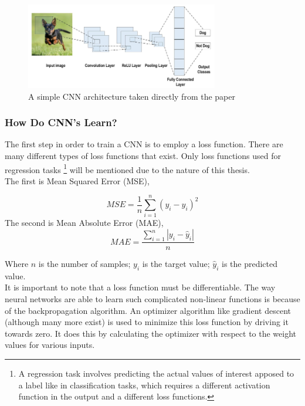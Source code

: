 \begin{figure}
	\includegraphics[width=0.75\textwidth]{../Figures/classical_cnn.png}
	\centering
	\caption[CNN]{A simple CNN architecture taken directly from the  paper \cite{alzubaidi2021review}} 
	\label{simple_cnn}
\end{figure}

\subsubsection*{How Do CNN's Learn?}
The first step in order to train a CNN is to employ a loss function. There are many different types of loss functions that exist. Only loss functions used for regression tasks \footnote{A regression task involves predicting the actual values of interest apposed to a label like in classification tasks, which requires a different activation function in the output and a different loss functions.} will be mentioned due to the nature of this thesis. \\

The first is Mean Squared Error (MSE),

\begin{equation}
	\label{eq:2.2}
	MSE = \frac{1}{n}\sum_{i=1}^{n}\left(y_{i} - \hat{y}_{i}\right)^{2}
\end{equation}
The second is Mean Absolute Error (MAE),
\begin{equation}
	\label{eq:2.3}
	MAE = \frac{\sum_{i=1}^{n}\left|y_{i} - \hat{y}_{i}\right|}{n}
\end{equation}

Where $n$ is the number of samples; $y_{i}$ is the target value; $\hat{y}_{i}$ is the predicted value. \\

It is important to note that a loss function must be differentiable. The way neural networks are able to learn such complicated non-linear functions is because of the backpropagation algorithm. An optimizer algorithm like gradient descent (although many more exist) is used to minimize this loss function by driving it towards zero. It does this by calculating the optimizer with respect to the weight values for various inputs.

